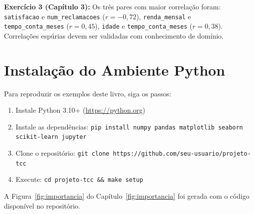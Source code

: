\documentclass[
    12pt,
    oneside,
    a4paper,
    english,
    brazilian
    ]{abntex2}
\numberwithin{equation}{chapter}
\begin{document}
\noindent\textbf{Exercício 3 (Capítulo 3):} Os três pares com maior correlação foram: \texttt{satisfacao} e \texttt{num\_reclamacoes} ($r = -0,72$), \texttt{renda\_mensal} e \texttt{tempo\_conta\_meses} ($r = 0,45$), \texttt{idade} e \texttt{tempo\_conta\_meses} ($r = 0,38$). Correlações espúrias devem ser validadas com conhecimento de domínio.

\chapter{Instalação do Ambiente Python}

Para reproduzir os exemplos deste livro, siga os passos:

\begin{enumerate}
    \item Instale Python 3.10+ (\url{https://python.org})
    \item Instale as dependências: \texttt{pip install numpy pandas matplotlib seaborn scikit-learn jupyter}
    \item Clone o repositório: \texttt{git clone https://github.com/seu-usuario/projeto-tcc}
    \item Execute: \texttt{cd projeto-tcc \&\& make setup}
\end{enumerate}

A Figura~\ref{fig:importancia} do Capítulo~\ref{fig:importancia} foi gerada com o código disponível no repositório.

\newpage


\end{document}
